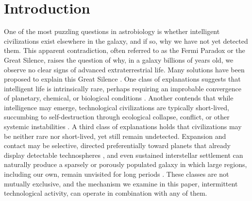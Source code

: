 \section{Introduction}\label{introduction}

One of the most puzzling questions in astrobiology is whether intelligent civilizations exist elsewhere in the galaxy, and if so, why we have not yet detected them. This apparent contradiction, often referred to as the Fermi Paradox or the Great Silence, raises the question of why, in a galaxy billions of years old, we observe no clear signs of advanced extraterrestrial life. Many solutions have been proposed to explain this Great Silence \citep{Webb2015-vi}. One class of explanations suggests that intelligent life is intrinsically rare, perhaps requiring an improbable convergence of planetary, chemical, or biological conditions \citep{Wesson1990-xi}. Another contends that while intelligence may emerge, technological civilizations are typically short-lived, succumbing to self-destruction through ecological collapse, conflict, or other systemic instabilities \citep{Vinn2024-pi}. A third class of explanations holds that civilizations may be neither rare nor short-lived, yet still remain undetected. Expansion and contact may be selective, directed preferentially toward planets that already display detectable technospheres \citep{Wandel2022-fp}, and even sustained interstellar settlement can naturally produce a sparsely or porously populated galaxy in which large regions, including our own, remain unvisited for long periods \citep{Carroll-Nellenback2019-aurora}. These classes are not mutually exclusive, and the mechanism we examine in this paper, intermittent technological activity, can operate in combination with any of them.

